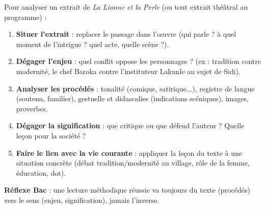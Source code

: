 \documentclass[11pt]{article}
\begin{document}
\begin{methode}
Pour analyser un extrait de \emph{La Lionne et la Perle} (ou tout extrait théâtral au programme) :
\begin{enumerate}
\item \textbf{Situer l'extrait} : replacer le passage dans l'œuvre (qui parle ? à quel moment de l'intrigue ? quel acte, quelle scène ?).
\item \textbf{Dégager l'enjeu} : quel conflit oppose les personnages ? (ex : tradition contre modernité, le chef Baroka contre l'instituteur Lakunle au sujet de Sidi).
\item \textbf{Analyser les procédés} : tonalité (comique, satirique...), registre de langue (soutenu, familier), gestuelle et didascalies (indications scéniques), images, proverbes.
\item \textbf{Dégager la signification} : que critique ou que défend l'auteur ? Quelle leçon pour la société ?
\item \textbf{Faire le lien avec la vie courante} : appliquer la leçon du texte à une situation concrète (débat tradition/modernité au village, rôle de la femme, éducation, dot).
\end{enumerate}
\textbf{Réflexe Bac} : une lecture méthodique réussie va toujours du texte (procédés) vers le sens (enjeu, signification), jamais l'inverse.
\end{methode}
\end{document}

